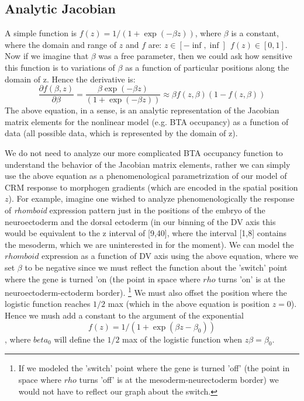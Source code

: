 \subsection{Analytic Jacobian }
A simple function is $f(z)=1/(1+\exp(-\beta z))$, where $\beta$ is a constant, where the domain and range of $z$ and $f$ are: $z \in [-\inf,\inf] \ \ f(z) \in [0,1]$.  Now if we imagine that $\beta$ was a free parameter, then we could ask how sensitive this function is to variations of $\beta$ as a function of particular positions along the domain of z.  Hence the derivative is:
\begin{equation}
 \frac{\partial{f(\beta,z)}}{\partial{\beta}}= \frac{\beta \exp{(-\beta z)}}{(1 + \exp{(-\beta z)})} \approx  \beta f(z,\beta) (1-f(z,\beta))
 \end{equation}
 The above equation, in a sense, is an analytic representation of the Jacobian matrix elements for the nonlinear model (e.g. BTA occupancy) as a function of data (all possible data, which is represented by the domain of z).  
 
 We do not need to analyze our more complicated BTA occupancy function to understand the behavior of the Jacobian matrix elements, rather we can simply use the above equation as a phenomenological parametrization of our model of CRM response to morphogen gradients (which are encoded in the spatial position $z$).  For example, imagine one wished to analyze phenomenologically the response of \textit{rhomboid} expression pattern just in the positions of the embryo of the neuroectoderm and the dorsal ectoderm (in our binning of the DV axis this would be equivalent to the z interval of [9,40], where the interval [1,8] contains the mesoderm, which we are uninterested in for the moment).  We can model the $rhomboid$ expression as a function of DV axis using the above equation, where we set $\beta$ to be negative since we must reflect the function about the 'switch' point where the gene is turned 'on (the point in space where $rho$ turns 'on' is at the neuroectoderm-ectoderm border).  \footnote{If we modeled the 'switch' point where the gene is turned 'off' (the point in space where $rho$ turns 'off' is at the mesoderm-neurectoderm border) we would not have to reflect our graph about the switch.}  We must also offset the position where the logistic function reaches $1/2$ max (which in the above equation is position $z=0$).  Hence we mush add a constant to the argument of the exponential $$f(z)=1/(1+\exp(\beta z -\beta_0 ))$$, where $beta_0 $ will define the $1/2$ max of the logistic function when $z\beta=\beta_0$.
 
